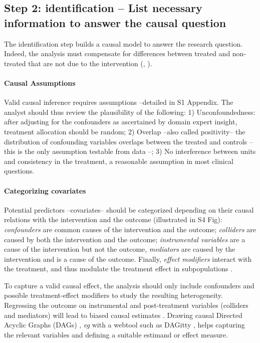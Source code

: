 \documentclass[10pt,letterpaper]{article}
\begin{document}
\subsection*{Step 2: identification -- List necessary information to answer the causal question}\label{sec:identification}

The identification step builds a causal model to answer the research question.
%
Indeed, the analysis must compensate for differences between
treated and non-treated that are not due to the intervention
(\cite[chapter~1]{pearl2018book},
\cite[chapter~1]{hernan2020causal}).

\paragraph{Causal Assumptions}

Valid causal inference requires assumptions  \cite{rubin2005causal} --detailed
in S1 Appendix. The analyst should thus review the
plausibility of the following: 1) Unconfoundedness: after adjusting for the
confounders as ascertained by domain expert insight, treatment allocation should
be random; 2) Overlap --also called positivity-- the distribution of confounding
variables overlaps between the treated and controls --this is the only
assumption testable from data \cite{austin2015moving}--; 3) No interference
between units and consistency in the treatment, a reasonable assumption in most
clinical questions.

\paragraph{Categorizing covariates}
%
Potential predictors --covariates-- should be categorized depending on their
causal relations with the intervention and the outcome (illustrated in
S4 Fig): \emph{confounders} are common causes of the
intervention and the outcome; \emph{colliders} are caused by both the
intervention and the outcome; \emph{instrumental variables} are a cause of the
intervention but not the outcome, \emph{mediators} are caused by the
intervention and is a cause of the outcome. Finally, \emph{effect modifiers}
interact with the treatment, and thus
modulate the treatment effect in subpopulations \cite{attia2022proposal}.

To capture a valid causal effect, the analysis should only include confounders
and possible treatment-effect modifiers to study the resulting heterogeneity.
Regressing the outcome on instrumental and post-treatment variables (colliders
and mediators) will lead to biased causal estimates
\cite{vanderweele2019principles}. Drawing causal Directed Acyclic Graphs
(DAGs) \cite{greenland1999causal}, \emph{eg} with a webtool such as DAGitty \cite{textor2011dagitty}, helps capturing the relevant
variables and defining a suitable estimand or effect measure.
\end{document}
